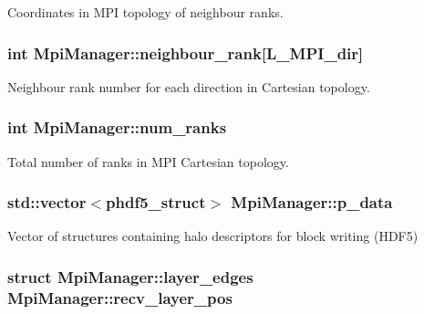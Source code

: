 Coordinates in M\+PI topology of neighbour ranks. 

\subsubsection[{\texorpdfstring{neighbour\+\_\+rank}{neighbour_rank}}]{\setlength{\rightskip}{0pt plus 5cm}int Mpi\+Manager\+::neighbour\+\_\+rank\mbox{[}{\bf L\+\_\+\+M\+P\+I\+\_\+dir}\mbox{]}}\hypertarget{class_mpi_manager_a3f3db562bc7ba8871180c5c9ac388c13}{}\label{class_mpi_manager_a3f3db562bc7ba8871180c5c9ac388c13}


Neighbour rank number for each direction in Cartesian topology. 

\subsubsection[{\texorpdfstring{num\+\_\+ranks}{num_ranks}}]{\setlength{\rightskip}{0pt plus 5cm}int Mpi\+Manager\+::num\+\_\+ranks\hspace{0.3cm}{\ttfamily [static]}}\hypertarget{class_mpi_manager_af5156a5e4519f43230b6b84792464e48}{}\label{class_mpi_manager_af5156a5e4519f43230b6b84792464e48}


Total number of ranks in M\+PI Cartesian topology. 

\subsubsection[{\texorpdfstring{p\+\_\+data}{p_data}}]{\setlength{\rightskip}{0pt plus 5cm}std\+::vector$<${\bf phdf5\+\_\+struct}$>$ Mpi\+Manager\+::p\+\_\+data}\hypertarget{class_mpi_manager_a03972530e718d5b0a7f119e9c6132179}{}\label{class_mpi_manager_a03972530e718d5b0a7f119e9c6132179}


Vector of structures containing halo descriptors for block writing (H\+D\+F5) 

\subsubsection[{\texorpdfstring{recv\+\_\+layer\+\_\+pos}{recv_layer_pos}}]{\setlength{\rightskip}{0pt plus 5cm}struct {\bf Mpi\+Manager\+::layer\+\_\+edges}  Mpi\+Manager\+::recv\+\_\+layer\+\_\+pos}\hypertarget{class_mpi_manager_a998340f11dea2614b477e463a1bec543}{}\label{class_mpi_manager_a998340f11dea2614b477e463a1bec543}
